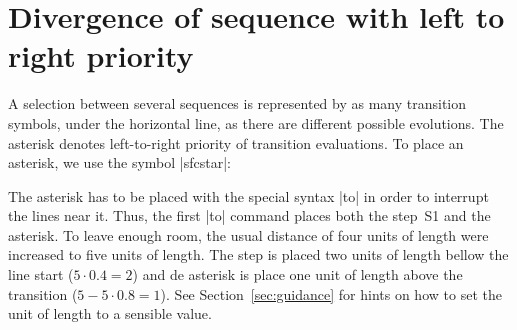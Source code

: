 \documentclass[a4paper]{ltxdoc}
\begin{document}
\section{Divergence of sequence with left to right priority}
A selection between several sequences is represented by as many transition symbols, under the horizontal line, as there are different possible evolutions. The asterisk denotes left-to-right priority of transition evaluations. To place an asterisk, we use the symbol |sfcstar|:

\begin{codeexample}[]
\end{codeexample}

The asterisk has to be placed with the special syntax |to| in order to interrupt the lines near it. Thus, the first |to| command places both the step~S1 and the asterisk. To leave enough room, the usual distance of four units of length were increased to five units of length. The step is placed two units of length bellow the line start ($5\cdot 0.4=2$) and de asterisk is place one unit of length above the transition ($5-5\cdot 0.8=1$). See Section~\ref{sec:guidance} for hints on how to set the unit of length to a sensible value.
\end{document}
